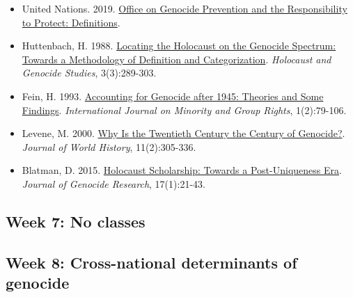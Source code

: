 \documentclass[12pt,]{article}
\providecommand{\tightlist}{%
  \setlength{\itemsep}{0pt}\setlength{\parskip}{0pt}}
\begin{document}
\begin{itemize}
\tightlist
\item
  United Nations. 2019.
  \href{https://www.un.org/en/genocideprevention/genocide.shtml}{Office
  on Genocide Prevention and the Responsibility to Protect:
  Definitions}.
\item
  Huttenbach, H. 1988.
  \href{https://academic.oup.com/hgs/article/3/3/289/602465}{Locating
  the Holocaust on the Genocide Spectrum: Towards a Methodology of
  Definition and Categorization}. \emph{Holocaust and Genocide Studies},
  3(3):289-303.
\item
  Fein, H. 1993.
  \href{http://booksandjournals.brillonline.com/content/journals/10.1163/157181193x00013}{Accounting
  for Genocide after 1945: Theories and Some Findings}.
  \emph{International Journal on Minority and Group Rights},
  1(2):79-106.
\item
  Levene, M. 2000. \href{https://muse.jhu.edu/article/18358/pdf}{Why Is
  the Twentieth Century the Century of Genocide?}. \emph{Journal of
  World History}, 11(2):305-336.
\item
  Blatman, D. 2015.
  \href{https://www.tandfonline.com/doi/abs/10.1080/14623528.2015.991206}{Holocaust
  Scholarship: Towards a Post-Uniqueness Era}. \emph{Journal of Genocide
  Research}, 17(1):21-43.
\end{itemize}

\hypertarget{week-7-no-classes}{%
\subsection{Week 7: No classes}\label{week-7-no-classes}}

\hypertarget{week-8-cross-national-determinants-of-genocide}{%
\subsection{Week 8: Cross-national determinants of
genocide}\label{week-8-cross-national-determinants-of-genocide}}
\end{document}
